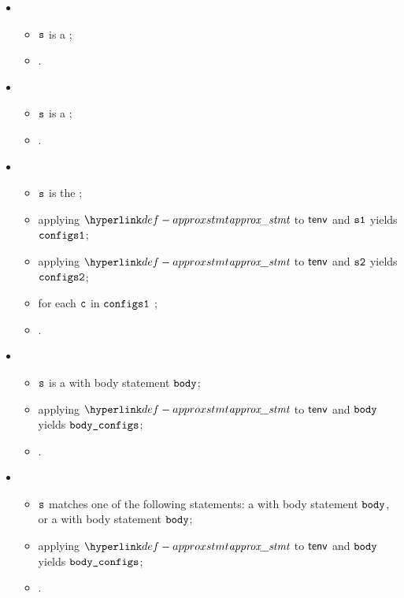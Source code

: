 \begin{itemize}
  \item {}
  \begin{itemize}
    \item $\texttt{s}$ is a \returnstatementsterm;
    \item {}.
  \end{itemize}

  \item {}
  \begin{itemize}
    \item $\texttt{s}$ is a \throwstatementsterm;
    \item  {}.
  \end{itemize}

  \item {}
  \begin{itemize}
    \item $\texttt{s}$ is the \sequencingstatement{$\vsone$}{$\vstwo$};
    \item applying $\approxstmt$ to $\textsf{tenv}$ and $\vsone$ yields $\texttt{configs1}$;
    \item applying $\approxstmt$ to $\textsf{tenv}$ and $\vstwo$ yields $\texttt{configs2}$;
    \item for each \Proseabstractconfiguration{} $\texttt{c}$ in $\texttt{configs1}$ ;
    \item {}.
  \end{itemize}

  \item {}
  \begin{itemize}
    \item $\texttt{s}$ is a \repeatstatementsterm{} with body statement $\texttt{body}$;
    \item applying $\approxstmt$ to $\textsf{tenv}$ and $\texttt{body}$ yields $\texttt{body\_configs}$;
    \item {}.
  \end{itemize}

  \item {}
  \begin{itemize}
    \item $\texttt{s}$ matches one of the following statements:
          a \forstatementterm{} with body statement $\texttt{body}$, or a \whilestatementterm{} with body statement $\texttt{body}$;
    \item applying $\approxstmt$ to $\textsf{tenv}$ and $\texttt{body}$ yields $\texttt{body\_configs}$;
    \item {}.
  \end{itemize}


\end{itemize}
